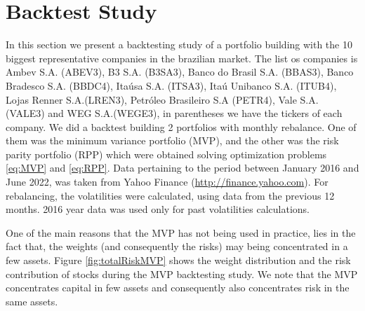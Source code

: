 
\section{Backtest Study}

In this section we present a backtesting study of a portfolio building with the 10 biggest representative companies in the brazilian market. The list os companies is Ambev S.A. (ABEV3), B3 S.A. (B3SA3), Banco do Brasil S.A. (BBAS3), Banco Bradesco S.A. (BBDC4), Itaúsa S.A. (ITSA3), Itaú Unibanco S.A. (ITUB4), Lojas Renner S.A.(LREN3), Petróleo Brasileiro S.A (PETR4), Vale S.A. (VALE3) and WEG S.A.(WEGE3), in parentheses we have the tickers of each company.  We did a backtest building 2 portfolios with monthly rebalance. One of them was the minimum variance portfolio (MVP), and the other was the risk parity portfolio (RPP) which were obtained solving optimization problems \eqref{eq:MVP} and \eqref{eq:RPP}. Data pertaining to the period between January 2016  and June 2022, was taken from Yahoo Finance (\url{http://finance.yahoo.com}). For rebalancing, the volatilities were calculated, using data from the previous 12 months. 2016 year data was used only for past volatilities calculations. 

One of the main reasons that the MVP has not being used in practice, lies in the fact that, the weights (and consequently the risks) may being concentrated in a few assets. Figure \ref{fig:totalRiskMVP} shows the weight distribution and the risk contribution of stocks during the MVP backtesting study. We note that the MVP concentrates capital in few assets and consequently also concentrates risk in the same assets.



